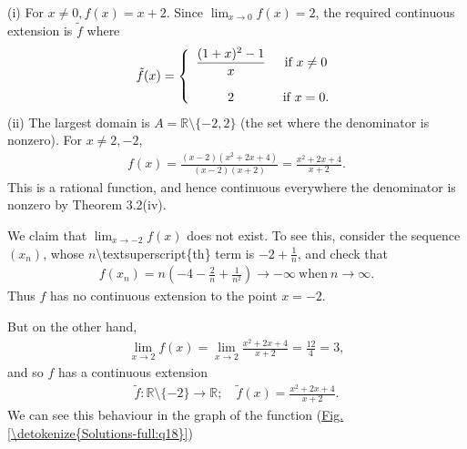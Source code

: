 \documentclass[letterpaper,10pt,english]{jupyterBook}
\begin{document}
\sphinxAtStartPar
(i) For \(x \neq 0, f(x) = x+2\). Since \(\lim_{x \rightarrow 0}f(x) = 2\), the required continuous extension is \(\tilde{f}\) where
\begin{equation*}
\begin{split}
\tilde{f}(x) = \left\{\begin{array}{c c} \displaystyle\frac{(1 + x)^{2} - 1}{x} & ~\mbox{if}~x \neq 0\\ 
& \\
2 & ~\mbox{if}~x = 0. \end{array} \right.
\end{split}
\end{equation*}
\sphinxAtStartPar
(ii) The largest domain is \(A=\mathbb{R} \setminus \{-2, 2\}\) (the set where the denominator is non\sphinxhyphen{}zero). For \(x \neq 2, -2\),
\begin{equation*}
\begin{split}
f(x) = \frac{(x-2)(x^{2} + 2x + 4)}{(x-2)(x+2)}=\frac{x^{2} + 2x + 4}{x + 2}.
\end{split}
\end{equation*}
\sphinxAtStartPar
This is a rational function, and hence continuous everywhere the denominator is non\sphinxhyphen{}zero by Theorem 3.2(iv).

We claim that \(\lim_{x \rightarrow -2}f(x)\) does not exist. To see this, consider the sequence \((x_{n})\), whose \(n\)\textbackslash{}textsuperscript\{th\} term is \(-2 + \frac{1}{n}\), and check that
\begin{equation*}
\begin{split}
f(x_{n}) = n\left(-4 -\frac{2}{n} + \frac{1}{n^2}\right) \rightarrow -\infty~\mbox{when}~n \rightarrow \infty.
\end{split}
\end{equation*}
\sphinxAtStartPar
Thus \(f\) has no continuous extension to the point \(x =-2\).

But on the other hand,
\begin{equation*}
\begin{split}
\lim_{x \rightarrow 2}f(x) = \lim_{x\rightarrow 2}  \frac{x^{2} + 2x + 4}{x + 2} = \frac{12}{4} = 3,
\end{split}
\end{equation*}
\sphinxAtStartPar
and so \(f\) has a continuous extension
\begin{equation*}
\begin{split}
\tilde{f}:\mathbb{R} \setminus \{-2\}\to\mathbb{R}; \hspace{1em} \tilde{f}(x) = \frac{x^2+2x+4}{x+2}.
\end{split}
\end{equation*}
\sphinxAtStartPar
We can see this behaviour in the graph of the function (\hyperref[\detokenize{Solutions-full:q18}]{Fig.\@ \ref{\detokenize{Solutions-full:q18}}})
\end{document}
